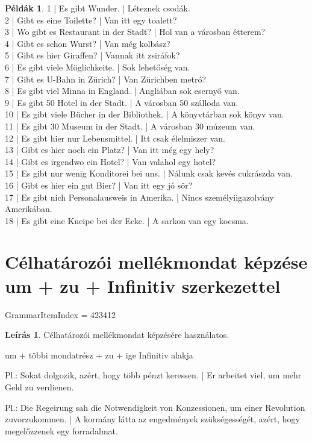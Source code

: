 \documentclass{article}
\theoremstyle{definition}
\newtheorem*{exmp}{Példák}
\newtheorem*{desc}{Leírás}
\begin{document}
\begin{exmp}
1 | Es gibt Wunder. | Léteznek csodák.\\
2 | Gibt es eine Toilette? | Van itt egy toalett?\\
3 | Wo gibt es Restaurant in der Stadt? | Hol van a városban étterem?\\
4 | Gibt es schon Wurst? | Van még kolbász?\\
5 | Gibt es hier Giraffen? | Vannak itt zsiráfok?\\
6 | Es gibt viele Möglichkeite. | Sok lehetőség van.\\
7 | Gibt es U-Bahn in Zürich? | Van Zürichben metró?\\
8 | Es gibt viel Minna in England. | Angliában sok esernyő van.\\
9 | Es gibt 50 Hotel in der Stadt. | A városban 50 szálloda van.\\
10 | Es gibt viele Bücher in der Bibliothek. | A könyvtárban sok könyv van.\\
11 | Es gibt 30 Museum in der Stadt. | A városban 30 múzeum van.\\
12 | Es gibt hier nur Lebensmittel. | Itt csak élelmiszer van.\\
13 | Gibt es hier noch ein Platz? | Van itt még egy hely?\\
14 | Gibt es irgendwo ein Hotel? | Van valahol egy hotel?\\
15 | Es gibt nur wenig Konditorei bei uns. | Nálunk csak kevés cukrászda van.\\
16 | Gibt es hier ein gut Bier? | Van itt egy jó sör?\\
17 | Es gibt nich Personalausweis in Amerika. | Nincs személyiigazolvány Amerikában.\\
18 | Es gibt eine Kneipe bei der Ecke. | A sarkon van egy kocsma.\\
\end{exmp}

\section{Célhatározói mellékmondat képzése um + zu + Infinitiv szerkezettel}

GrammarItemIndex = 423412

\begin{desc}
Célhatározói mellékmondat képzésére használatos.

um + többi mondatrész + zu + ige Infinitiv alakja

Pl.: Sokat dolgozik, azért, hogy több pénzt keressen. | Er arbeitet viel, um mehr Geld zu verdienen.

Pl.: Die Regeirung sah die Notwendigkeit von Konzessionen, um einer Revolution zuvorzukommen. | A kormány látta az engedmények szükségességét, azért, hogy megelőzzenek egy forradalmat.
\end{desc}
\end{document}
